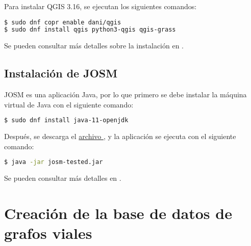\label{subsec:instalacion_qgis}

Para instalar QGIS 3.16, se ejecutan los siguientes comandos:

\begin{lstlisting}[language=bash]
$ sudo dnf copr enable dani/qgis
$ sudo dnf install qgis python3-qgis qgis-grass
\end{lstlisting}

Se pueden consultar más detalles sobre la instalación en
\cite{InstalacionQGIS}.


\subsection{Instalación de JOSM}

\label{subsec:instalacion_josm}

JOSM es una aplicación Java, por lo que primero se debe instalar la máquina
virtual de Java con el siguiente comando:

\begin{lstlisting}[language=bash]
$ sudo dnf install java-11-openjdk
\end{lstlisting}

Después, se descarga el
\href{https://josm.openstreetmap.de/wiki/Download}{archivo
}, y la aplicación se ejecuta con el siguiente comando:

\begin{lstlisting}[language=bash]
$ java -jar josm-tested.jar
\end{lstlisting}

Se pueden consultar más detalles en \cite{DescargaJOSM}.


\section{Creación de la base de datos de grafos viales}

\label{sec:creacion_base_de_datos_de_grafos_viales}

